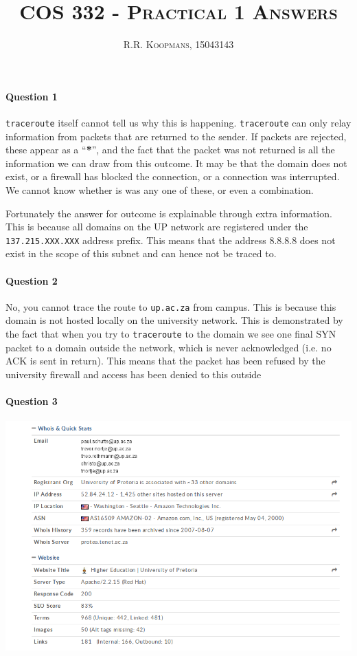 \documentclass[12pt,a4paper]{article}
\title{\textsc{COS 332 - Practical 1 Answers}}
\author{\textsc{R.R. Koopmans, 15043143}}
\begin{document}
\maketitle

\paragraph{Question 1}

\texttt{traceroute} itself cannot tell us why this is happening.
\texttt{traceroute} can only relay information from packets that are returned to
the sender. If packets are rejected, these appear as a ``\textbf{*}'', and the fact
that the packet was not returned is all the information we can draw from this
outcome. It may be that the domain does not exist, or a firewall has blocked the
connection, or a connection was interrupted. We cannot know whether is was any
one of these, or even a combination.

Fortunately the answer for outcome is explainable through extra information.
This is because all domains on the UP network are registered under the
\texttt{137.215.XXX.XXX} address prefix. This means that the address 8.8.8.8
does not exist in the scope of this subnet and can hence not be traced to.

\paragraph{Question 2}

No, you cannot trace the route to \texttt{up.ac.za} from campus. This is because
this domain is not hosted locally on the university network. This is
demonstrated by the fact that when you try to \texttt{traceroute} to the domain
we see one final SYN packet to a domain outside the network, which  is never
acknowledged (i.e. no ACK is sent in return). This means that the packet has
been refused by the university firewall and access has been denied to this
outside

\paragraph{Question 3}

\begin{center}
  \includegraphics[scale=0.5]{whoiscropped}
\end{center}
\end{document}
